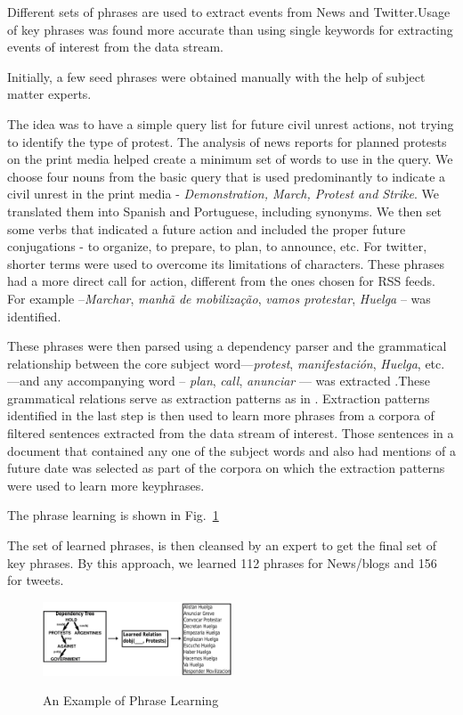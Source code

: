 Different sets of phrases are used to extract events from News and Twitter.Usage of key phrases was found more accurate than using single keywords for extracting events of interest from the data stream.

Initially, a few seed phrases were obtained manually
with the help of subject matter experts.


The idea was to have a simple query list for future civil unrest actions, not trying to identify the type of protest. The analysis of news reports for planned protests on the print media helped create a minimum set of words to use in the query.
We choose four nouns from the basic query that is used predominantly to indicate a civil unrest in the print media - {\em Demonstration, March, Protest and Strike}. We translated them into Spanish and Portuguese, including synonyms.
We then set some verbs that indicated a future action and included the proper future conjugations - to organize, to prepare, to plan, to announce, etc. For twitter, shorter terms were used to overcome its limitations of characters. These phrases had a more direct call for action, different from the ones chosen for RSS feeds. For example --{\em Marchar}, {\em manhã de mobilização}, {\em vamos  protestar}, {\em Huelga} -- was identified.

These phrases were then parsed
using a dependency parser and the grammatical relationship between the
core subject word---{\em protest}, {\em manifestación}, {\em Huelga},
etc.---and any accompanying word -- {\em plan}, {\em call}, {\em anunciar} --- was extracted .These grammatical relations serve as extraction patterns as in \cite{riloff2003learning}. 
Extraction patterns identified in the last step is then used to learn more phrases from a corpora of filtered sentences extracted from the data stream of interest. Those sentences in a document that contained any one of the subject words and also had mentions of a future date was selected as part of the corpora on which the extraction patterns were used to learn more keyphrases.

The phrase learning is shown in Fig.~\ref{fig:phraselearning}

The set of learned phrases, is then cleansed by an expert to get the final set of key phrases.
By this approach, we learned 112 phrases for News/blogs and 156 for tweets.

\begin{figure}
\caption{An Example of Phrase Learning}
\includegraphics[width=0.5\textwidth]{figures/phraseLearning}
\label{fig:phraselearning}
\end{figure}
